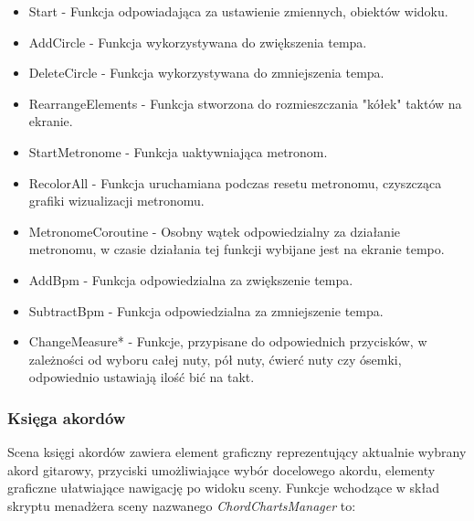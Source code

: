 \begin{itemize}
    \item Start - Funkcja odpowiadająca za ustawienie zmiennych, obiektów widoku. 
    \item AddCircle - Funkcja wykorzystywana do zwiększenia tempa.
    \item DeleteCircle - Funkcja wykorzystywana do zmniejszenia tempa.
    \item RearrangeElements - Funkcja stworzona do rozmieszczania "kółek" taktów na ekranie.
    \item StartMetronome - Funkcja uaktywniająca metronom.
    \item RecolorAll - Funkcja uruchamiana podczas resetu metronomu, czyszcząca grafiki wizualizacji metronomu.
    \item MetronomeCoroutine - Osobny wątek odpowiedzialny za działanie metronomu, w czasie działania tej funkcji wybijane jest na ekranie tempo.
    \item AddBpm - Funkcja odpowiedzialna za zwiększenie tempa.
    \item SubtractBpm - Funkcja odpowiedzialna za zmniejszenie tempa.
    \item ChangeMeasure* - Funkcje, przypisane do odpowiednich przycisków, w zależności od wyboru całej nuty, pół nuty, ćwierć nuty czy ósemki, odpowiednio ustawiają ilość bić na takt.
\end{itemize}
\subsubsection{Księga akordów}

Scena księgi akordów zawiera element graficzny reprezentujący aktualnie wybrany akord gitarowy, przyciski umożliwiające wybór docelowego akordu, elementy graficzne ułatwiające nawigację po widoku sceny. Funkcje wchodzące w skład skryptu menadżera sceny nazwanego \emph{ChordChartsManager} to:

